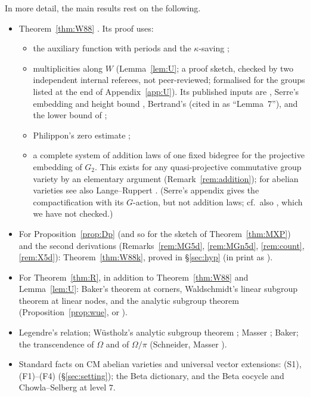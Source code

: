 \documentclass[11pt]{amsart}
\theoremstyle{definition}
\begin{document}
\noindent In more detail, the main results rest on the following.
\begin{itemize}
\item Theorem~\ref{thm:W88} \cite[Thm.~4.1]{W88}. Its proof \cite[\S\S6--7]{W88} uses:
\begin{itemize}
\item the auxiliary function with periods and the $\kappa$-saving \cite[Prop.~2.1, 2.4]{W83};
\item multiplicities along $W$ (Lemma~\ref{lem:U}; a proof sketch, checked by two independent internal referees, not
peer-reviewed; formalised for the groups listed at the end of Appendix~\ref{app:U}). Its published inputs are
\cite[Prop.~2.1, Lemma~2.2]{W83}, Serre's embedding and height bound \cite{Se79}, Bertrand's \cite[App.~I, Lemme~7 and its
Corollaire, with Lemme~1]{W79} (cited in \cite[p.~396]{W88} as ``Lemma~7''), and the lower bound of \cite[p.~640]{W83};
\item Philippon's zero estimate \cite{Ph86};
\item a complete system of addition laws of one fixed bidegree for the projective embedding of $G_2$. This exists for
any quasi-projective commutative group variety by an elementary argument (Remark~\ref{rem:addition}); for abelian
varieties see also Lange--Ruppert \cite{LR85}. (Serre's appendix \cite{Se79} gives the compactification with its
$G$-action, but not addition laws; cf.\ also \cite{FW84}, which we have not checked.)
\end{itemize}
\item For Proposition~\ref{prop:Dp} (and so for the sketch of Theorem~\ref{thm:MXP}) and the second derivations
(Remarks~\ref{rem:MG5d}, \ref{rem:MGn5d}, \ref{rem:count}, \ref{rem:X5d}): Theorem~\ref{thm:W88k}, proved in
\S\ref{sec:hyp} (in print as \cite[\S5d]{W88}).
\item For Theorem~\ref{thm:R}, in addition to Theorem~\ref{thm:W88} and Lemma~\ref{lem:U}: Baker's theorem \cite{Ba66} at corners,
Waldschmidt's linear subgroup theorem \cite[Thm.~11.21]{W00} at linear nodes, and the analytic subgroup theorem
(Proposition~\ref{prop:wue}, or \cite{Wu89}).
\item Legendre's relation; W\"ustholz's analytic subgroup theorem \cite{Wu89}; Masser \cite{Ma75}; Baker; the
transcendence of $\Omega$ and of $\Omega/\pi$ (Schneider, Masser \cite{Ma75}).
\item Standard facts on CM abelian varieties and universal vector extensions: (S1), (F1)--(F4) (\S\ref{sec:setting}); the
Beta dictionary, and the Beta cocycle and Chowla--Selberg \cite{Gr78} at level $7$.
\end{itemize}
\end{document}
